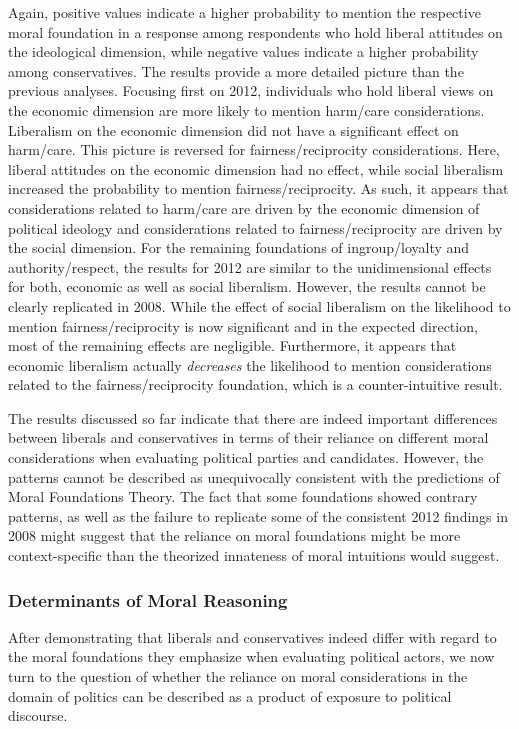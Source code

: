 \documentclass[12pt]{paper}
\begin{document}
Again, positive values indicate a higher probability to mention the respective moral foundation in a response among respondents who hold liberal attitudes on the ideological dimension, while negative values indicate a higher probability among conservatives. The results provide a more detailed picture than the previous analyses. Focusing first on 2012, individuals who hold liberal views on the economic dimension are more likely to mention harm/care considerations. Liberalism on the economic dimension did not have a significant effect on harm/care. This picture is reversed for fairness/reciprocity considerations. Here, liberal attitudes on the economic dimension had no effect, while social liberalism increased the probability to mention fairness/reciprocity. As such, it appears that considerations related to harm/care are driven by the economic dimension of political ideology and considerations related to fairness/reciprocity are driven by the social dimension. For the remaining foundations of ingroup/loyalty and authority/respect, the results for 2012 are similar to the unidimensional effects for both, economic as well as social liberalism. However, the results cannot be clearly replicated in 2008. While the effect of social liberalism on the likelihood to mention fairness/reciprocity is now significant and in the expected direction, most of the remaining effects are negligible. Furthermore, it appears that economic liberalism actually \textit{decreases} the likelihood to mention considerations related to the fairness/reciprocity foundation, which is a counter-intuitive result.


The results discussed so far indicate that there are indeed important differences between liberals and conservatives in terms of their reliance on different moral considerations when evaluating political parties and candidates. However, the patterns cannot be described as unequivocally consistent with the predictions of Moral Foundations Theory. The fact that some foundations showed contrary patterns, as well as the failure to replicate some of the consistent 2012 findings in 2008 might suggest that the reliance on moral foundations might be more context-specific than the theorized innateness of moral intuitions would suggest.


\subsubsection{Determinants of Moral Reasoning}

After demonstrating that liberals and conservatives indeed differ with regard to the moral foundations they emphasize when evaluating political actors, we now turn to the question of whether the reliance on moral considerations in the domain of politics can be described as a product of exposure to political discourse.
\end{document}
